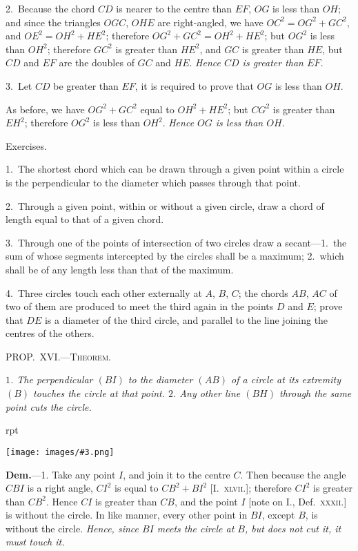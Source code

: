 \documentclass[oneside]{book}
\newcounter{wrapwidth}
\newcommand\mypropl[2]{
\bigskip\Needspace*{4\baselineskip}\begin{center}\textsc{#1}\end{center}
\hspace{\parindent}\emph{#2}\par\medskip
}
\newcommand\exhead[1]{
\Needspace*{5\baselineskip}\begin{center}
\textsf{#1}
\end{center}
}
\newcommand\imgflow[3]{
\setcounter{wrapwidth}{#1}
\begin{wrapfigure}[#2]{r}{\value{wrapwidth}pt}
\begin{center}
\vspace{-0.3in}
\texttt{[image: images/\#3.png]}
\end{center}
\end{wrapfigure}
}
\begin{document}
2.~Because the chord $CD$ is nearer to the centre
than $EF$, $OG$ is less than $OH$; and since the triangles
$OGC$, $OHE$ are right-angled, we have $OC^{2} = OG^{2} + GC^{2}$,
and $OE^{2} = OH^{2} + HE^{2}$; therefore $OG^{2} + GC^{2} = OH^{2} + HE^{2}$;
but $OG^{2}$ is less than $OH^{2}$; therefore $GC^{2}$ is greater
than $HE^{2}$, and $GC$ is greater than $HE$, but $CD$ and $EF$
are the doubles of $GC$ and $HE$. \emph{Hence $CD$ is greater
than $EF$.}

3.~Let $CD$ be greater than $EF$, it is required to
prove that $OG$ is less than $OH$.

As before, we have $OG^{2} + GC^{2}$ equal to $OH^{2} + HE^{2}$;
but $CG^{2}$ is greater than $EH^{2}$; therefore $OG^{2}$ is less
than $OH^{2}$. \emph{Hence $OG$ is less than $OH$.}

\exhead{Exercises.}

\begin{footnotesize}
1.~The shortest chord which can be drawn through a given
point within a circle is the perpendicular to the diameter which
passes through that point.

2.~Through a given point, within or without a given circle,
draw a chord of length equal to that of a given chord.

3.~Through one of the points of intersection of two circles
draw a secant---1.\ the sum of whose segments intercepted by the
circles shall be a maximum; 2.\ which shall be of any length
less than that of the maximum.

4.~Three circles touch each other externally at $A$, $B$, $C$; the
chords $AB$, $AC$ of two of them are produced to meet the third
again in the points $D$ and $E$; prove that $DE$ is a diameter of the
third circle, and parallel to the line joining the centres of the
others.
\par\end{footnotesize}

\mypropl{PROP\@.~XVI\@.---Theorem.}{$1$. The perpendicular $(BI)$ to the diameter $(AB)$ of a
circle at its extremity $(B)$ touches the circle at that point.
$2$. Any other line $(BH)$ through the same point cuts the
circle.}

\imgflow{125}{10}{f121}

\textbf{Dem.}---1. Take any point $I$, and join it to the centre
$C$. Then because the angle $CBI$
is a right angle, $CI^{2}$ is equal to
$CB^{2} + BI^{2}$ [I.~\textsc{xlvii}.]; therefore
$CI^{2}$ is greater than $CB^{2}$. Hence
$CI$ is greater than $CB$, and the
point $I$ [note on I., Def.~\textsc{xxxii.}]
is without the circle. In like
manner, every other point in
$BI$, except $B$, is without the
circle. \emph{Hence, since $BI$ meets
the circle at $B$, but does not cut it, it must touch it.}
\end{document}
